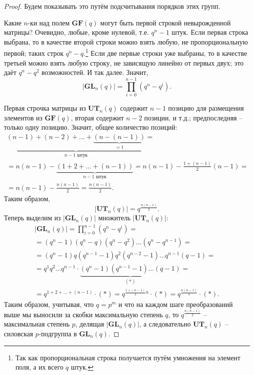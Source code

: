 \documentclass{article}
\begin{document}
\begin{proof}
    Будем показывать это путём подсчитывания порядков этих групп.

    Какие $n$-ки над полем $\textbf{GF}(q)$ могут быть первой строкой невырожденной матрицы? Очевидно, любые, кроме нулевой, т.е. $q^n - 1$ штук. Если первая строка выбрана, то в качестве второй строки можно взять любую, не пропорциональную первой; таких строк $q^n - q$.\footnote{Так как пропорциональная строка получается путём умножения на элемент поля, а их всего $q$ штук.} Если две первые строки уже выбраны, то в качестве третьей можно взять любую строку, не зависящую линейно от первых двух; это даёт $q^n - q^2$ возможностей. И так далее. Значит,
    $$ |\textbf{GL}_n(q)| = \prod_{i = 0}^{n - 1} (q^n - q^i). $$

    Первая строчка матрицы из $\textbf{UT}_n(q)$ содержит $n - 1$ позицию для размещения элементов из $\textbf{GF}(q)$, вторая содержит $n - 2$ позиции, и т.д.; предпоследняя -- только одну позицию. Значит, общее количество позиций:
    \begin{multline*} 
        \underbrace{(n - 1) + (n - 2) + \ldots + \underbrace{(n - (n - 1))}_{=1}}_{n-1 \text{ штук}} =\\ 
        = n(n-1) - \underbrace{(1 + 2 + \ldots + (n - 1))}_{n-1 \text{ штук}} = n(n - 1) - \frac{1 + (n - 1)}{2} (n - 1) = \\
        = n(n - 1) - \frac{n(n-1)}{2} = \frac{n(n-1)}{2}.
    \end{multline*}
    Таким образом, $$ |\textbf{UT}_n(q)| = q^{\frac{n(n-1)}{2}}. $$
    Теперь выделим из $|\textbf{GL}_n(q)|$ множитель $|\textbf{UT}_n(q)|$:
    \begin{multline*}
        |\textbf{GL}_n(q)| = \prod_{i = 0}^{n - 1} (q^n - q^i) = \\
        = (q^n - 1)(q^n - q) (q^n - q^2) \ldots (q^n - q^{n-1}) = \\
        = (q^n - 1) q (q^{n - 1} - 1) q^2 (q^{n - 2} - 1) \ldots q^{n-1} (q - 1) = \\
        = q^1 q^2 \ldots q^{n - 1} \cdot \underbrace{(q^n - 1)(q^{n - 1} - 1) \ldots (q - 1)}_{(*)} = \\
        = q^{1 + 2 + \ldots + (n - 1)} \cdot (*) = q^{\frac{1 + (n - 1)}{2} n} \cdot (*) = q^{\frac{n(n - 1)}{2}} \cdot (*).
    \end{multline*}
    Таким образом, учитывая, что $q = p^m$ и что на каждом шаге преобразований выше мы выносили за скобки максимальную степень $q$, то $q^{\frac{n(n - 1)}{2}}$ -- максимальная степень $p$, делящая $|\textbf{GL}_n(q)|$, а следовательно $\textbf{UT}_n(q)$ -- силовская $p$-подгруппа в $\textbf{GL}_n(q)$.
\end{proof}
\end{document}
